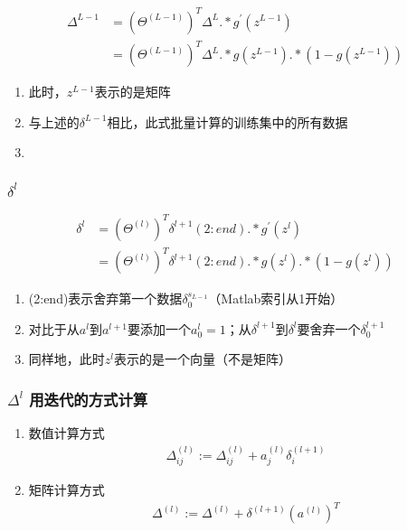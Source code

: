\begin{equation}\begin{aligned}
	\Delta^{L-1} &= (\Theta^{(L-1)})^T \Delta^{L} .* g^{'}(z^{L-1}) \\
	&= (\Theta^{(L-1)})^T \Delta^{L} .* g(z^{L-1}) .* (1-g(z^{L-1}))
\end{aligned}\end{equation}
\begin{enumerate}
	\item 此时，$z^{L-1}$表示的是矩阵
	\item 与上述的$\delta^{L-1}$相比，此式批量计算的训练集中的所有数据
	\item {}
\end{enumerate}


\subsubsection{$\delta^{l}$}
\begin{equation}\begin{aligned}
	\delta^{l} &= (\Theta^{(l)})^T \delta^{l+1}(2:end) .* g^{'}(z^{l}) \\
	&= (\Theta^{(l)})^T \delta^{l+1}(2:end) .* g(z^{l}) .* (1-g(z^{l}))
\end{aligned}\end{equation}
\begin{enumerate}
	\item (2:end)表示舍弃第一个数据$\delta_0^{s_{L-1}}$（Matlab索引从1开始）
	\item 对比于从$a^{l}$到$a^{l+1}$要添加一个$a_0^{l}=1$；从$\delta^{l+1}$到$\delta^{l}$要舍弃一个$\delta_0^{l+1}$
	\item 同样地，此时$z^{l}$表示的是一个向量（不是矩阵）
\end{enumerate}

\subsubsection{$\Delta^{l}$ 用迭代的方式计算}
\begin{enumerate}
	\item 数值计算方式
	\begin{equation}\begin{aligned}
		\Delta_{ij}^{(l)} := \Delta_{ij}^{(l)} + a_j^{(l)} \delta_i^{(l+1)}
	\end{aligned}\end{equation}
	\item 矩阵计算方式
	\begin{equation}\begin{aligned}
		\Delta^{(l)} := \Delta^{(l)} + \delta^{(l+1)} (a^{(l)})^T
	\end{aligned}\end{equation}
\end{enumerate}

